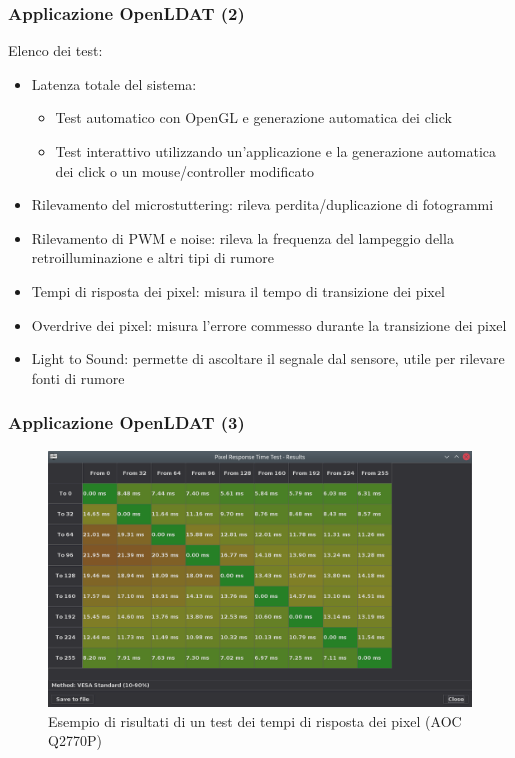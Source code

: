 \documentclass[xcolor={dvipsnames}]{beamer}
\begin{document}
\begin{frame}[shrink=7]
	\frametitle{Applicazione OpenLDAT (2)}
	Elenco dei test:\begin{itemize}
		\item \alert{Latenza totale del sistema}:\begin{itemize}
			\item \alert{Test automatico} con OpenGL e generazione automatica dei click
			\item \alert{Test interattivo} utilizzando un'applicazione e la generazione automatica dei click o un mouse/controller modificato
		\end{itemize}
		\item \alert{Rilevamento del microstuttering}: rileva perdita/duplicazione di fotogrammi
		\item \alert{Rilevamento di PWM e noise}: rileva la frequenza del lampeggio della retroilluminazione e altri tipi di rumore
		\item \alert{Tempi di risposta dei pixel}: misura il tempo di transizione dei pixel
		\item \alert{Overdrive dei pixel}: misura l'errore commesso durante la transizione dei pixel
		\item \alert{Light to Sound}: permette di ascoltare il segnale dal sensore, utile per rilevare fonti di rumore
	\end{itemize}
\end{frame}
\begin{frame}[shrink=10]
	\frametitle{Applicazione OpenLDAT (3)}
	\begin{figure}
		\includegraphics[width=\textwidth]{Applicazione_files/gui_pixelresponse_results.png}
		\caption*{Esempio di risultati di un test dei tempi di risposta dei pixel (AOC Q2770P)}
	\end{figure}
\end{frame}
\end{document}
